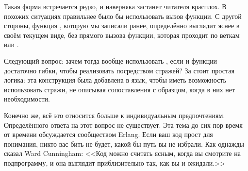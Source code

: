 Такая форма встречается редко, и наверняка застанет читателя врасплох.
В похожих ситуациях правильнее было бы использовать вызов функции.
С другой стороны, функция , которую мы записали ранее, определённо выглядит яснее в своём текущем виде, без прямого вызова функции, которая проходит по веткам  или .

Следующий вопрос: зачем тогда вообще использовать , если  и функции достаточно гибки, чтобы реализовать  посредством стражей?
За  стоит простая логика: эта конструкция была добавлена в язык, чтобы иметь возможность использовать стражи, не описывая сопоставления с образцом, когда в них нет необходимости.

Конечно же, всё это относится больше к индивидуальным предпочтениям.
Определённого ответа на этот вопрос не существует.
Эта тема до сих пор время от времени обсуждается сообществом Erlang.
Если ваш код прост для понимания, никто вас бить не будет, какой бы путь вы не избрали.
Как однажды сказал Ward Cunningham: <<Код можно считать ясным, когда вы смотрите на подпрограмму, и она выглядит приблизительно так, как вы и ожидали.>>
